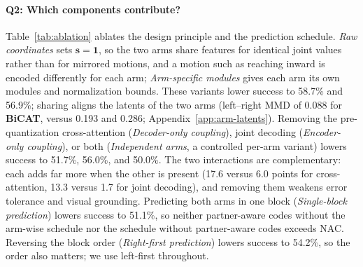 \paragraph{Q2: Which components contribute?}
Table~\ref{tab:ablation} ablates the design principle and the prediction
schedule. \emph{Raw coordinates} sets $\mathbf{s}=\mathbf{1}$, so the two
arms share features for identical joint values rather than for mirrored
motions, and a motion such as reaching inward is encoded differently for
each arm; \emph{Arm-specific modules} gives each arm its own modules and
normalization bounds. These variants lower success to 58.7\% and 56.9\%;
sharing
aligns the latents of the two arms (left--right MMD of 0.088 for
\textbf{BiCAT}, versus 0.193 and 0.286; Appendix~\ref{app:arm-latents}). Removing the
pre-quantization cross-attention (\emph{Decoder-only coupling}), joint
decoding (\emph{Encoder-only coupling}), or both (\emph{Independent arms}, a
controlled per-arm variant) lowers success to
51.7\%, 56.0\%, and 50.0\%. The two interactions are complementary: each
adds far more when the other is present (17.6 versus 6.0 points for
cross-attention, 13.3 versus 1.7 for joint decoding), and removing them
weakens error tolerance and visual grounding. Predicting both arms in one
block (\emph{Single-block prediction}) lowers success to 51.1\%, so neither
partner-aware codes without the arm-wise schedule nor the schedule without
partner-aware codes exceeds NAC. Reversing the block order
(\emph{Right-first prediction}) lowers success to 54.2\%, so the order also
matters; we use left-first throughout.






